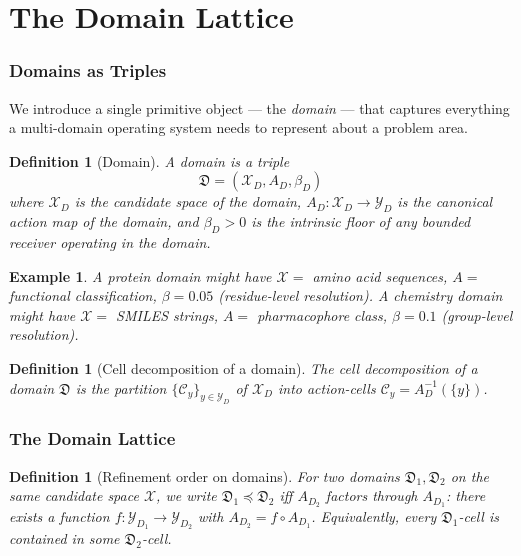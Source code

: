 \documentclass[11pt,a4paper]{article}
\newtheorem{definition}[theorem]{Definition}
\newtheorem{example}[theorem]{Example}
\newcommand{\Cands}{\mathcal{X}}
\newcommand{\Action}{\mathcal{Y}}
\newcommand{\Cell}{\mathcal{C}}
\newcommand{\Domain}{\mathfrak{D}}
\begin{document}
\part{The Domain Lattice}

\section{Domains as Triples}
\label{sec:domains}

We introduce a single primitive object — the \emph{domain} — that captures everything a multi-domain operating system needs to represent about a problem area.

\begin{definition}[Domain]
\label{def:domain}
A \emph{domain} is a triple
\[
\Domain = (\Cands_D, A_D, \beta_D)
\]
where $\Cands_D$ is the candidate space of the domain, $A_D : \Cands_D \to \Action_D$ is the canonical action map of the domain, and $\beta_D > 0$ is the intrinsic floor of any bounded receiver operating in the domain.
\end{definition}

\begin{example}
A protein domain might have $\Cands = $ amino acid sequences, $A = $ functional classification, $\beta = 0.05$ (residue-level resolution). A chemistry domain might have $\Cands = $ SMILES strings, $A = $ pharmacophore class, $\beta = 0.1$ (group-level resolution).
\end{example}

\begin{definition}[Cell decomposition of a domain]
\label{def:cell-decomp}
The \emph{cell decomposition} of a domain $\Domain$ is the partition $\{\Cell_y\}_{y \in \Action_D}$ of $\Cands_D$ into action-cells $\Cell_y = A_D^{-1}(\{y\})$.
\end{definition}

\section{The Domain Lattice}
\label{sec:domain-lattice}

\begin{definition}[Refinement order on domains]
\label{def:refinement-order}
For two domains $\Domain_1, \Domain_2$ on the same candidate space $\Cands$, we write $\Domain_1 \preceq \Domain_2$ iff $A_{D_2}$ factors through $A_{D_1}$: there exists a function $f : \Action_{D_1} \to \Action_{D_2}$ with $A_{D_2} = f \circ A_{D_1}$. Equivalently, every $\Domain_1$-cell is contained in some $\Domain_2$-cell.
\end{definition}
\end{document}
